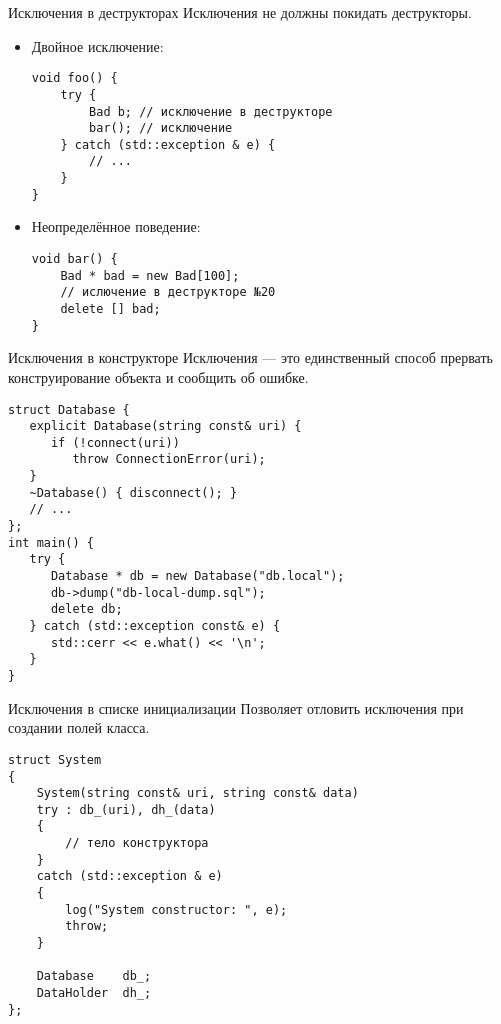\documentclass{beamer}
\begin{document}
\begin{frame}[fragile]{Исключения в деструкторах}
Исключения не должны покидать деструкторы.
\begin{itemize}
\item Двойное исключение:
\begin{lstlisting}
void foo() {
    try {
        Bad b; // исключение в деструкторе
        bar(); // исключение
    } catch (std::exception & e) {
        // ...
    }
}
\end{lstlisting}
\item Неопределённое поведение:
\begin{lstlisting}
void bar() {
    Bad * bad = new Bad[100];
    // ислючение в деструкторе №20
    delete [] bad;
}
\end{lstlisting}
\end{itemize}
\end{frame}

\begin{frame}[fragile]{Исключения в конструкторе}
Исключения — это единственный способ
прервать  конструирование объекта и сообщить об ошибке.

\begin{lstlisting}
struct Database {
   explicit Database(string const& uri) {
      if (!connect(uri))
         throw ConnectionError(uri);
   }
   ~Database() { disconnect(); }
   // ...
};
int main() {
   try {
      Database * db = new Database("db.local");
      db->dump("db-local-dump.sql");
      delete db;
   } catch (std::exception const& e) {
      std::cerr << e.what() << '\n';
   }
}

\end{lstlisting}
\end{frame}

\begin{frame}[fragile]{Исключения в списке инициализации}
Позволяет отловить исключения при создании полей класса.
\begin{lstlisting}
struct System 
{
    System(string const& uri, string const& data)
    try : db_(uri), dh_(data)
    {
        // тело конструктора
    }
    catch (std::exception & e) 
    {
        log("System constructor: ", e);
        throw;
    }
    
    Database    db_;
    DataHolder  dh_;
};   
\end{lstlisting}
\end{frame}
\end{document}
